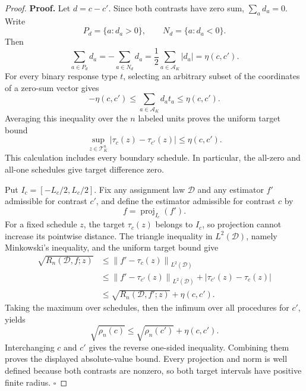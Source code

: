 \documentclass{article}
\begin{document}
\begin{proof}
\textbf{Proof.}
Let \(d=c-c'\).  Since both contrasts have zero sum, \(\sum_a d_a=0\).  Write
\[
 P_d=\{a:d_a>0\},\qquad N_d=\{a:d_a<0\}.
\]
Then
\[
 \sum_{a\in P_d}d_a=-\sum_{a\in N_d}d_a
 =\frac12\sum_{a\in\mathcal A_K}|d_a|=\eta(c,c').
\]
For every binary response type \(t\), selecting an arbitrary subset of the coordinates of a zero-sum vector gives
\[
 -\eta(c,c')\leq\sum_{a\in\mathcal A_K}d_at_a\leq\eta(c,c').
\]
Averaging this inequality over the \(n\) labeled units proves the uniform target bound
\[
 \sup_{z\in\mathcal T_K^n}|\tau_c(z)-\tau_{c'}(z)|
 \leq\eta(c,c').
\]
This calculation includes every boundary schedule.  In particular, the all-zero and all-one schedules give target difference zero.

Put \(I_c=[-L_c/2,L_c/2]\).  Fix any assignment law \(\mathcal D\) and any estimator \(f'\) admissible for contrast \(c'\), and define the estimator admissible for contrast \(c\) by
\[
 f=\operatorname{proj}_{I_c}(f').
\]
For a fixed schedule \(z\), the target \(\tau_c(z)\) belongs to \(I_c\), so projection cannot increase its pointwise distance.  The triangle inequality in \(L^2(\mathcal D)\), namely Minkowski's inequality, and the uniform target bound give
\[
 \begin{aligned}
 \sqrt{R_n(\mathcal D,f;z)}
 &\leq
 \left\|f'-\tau_c(z)\right\|_{L^2(\mathcal D)}\\
 &\leq
 \left\|f'-\tau_{c'}(z)\right\|_{L^2(\mathcal D)}
 +|\tau_{c'}(z)-\tau_c(z)|\\
 &\leq \sqrt{R_n(\mathcal D,f';z)}+\eta(c,c').
 \end{aligned}
\]
Taking the maximum over schedules, then the infimum over all procedures for \(c'\), yields
\[
 \sqrt{\rho_n(c)}\leq\sqrt{\rho_n(c')}+\eta(c,c').
\]
Interchanging \(c\) and \(c'\) gives the reverse one-sided inequality.  Combining them proves the displayed absolute-value bound.  Every projection and norm is well defined because both contrasts are nonzero, so both target intervals have positive finite radius. \(\square\)
\end{proof}
\end{document}
